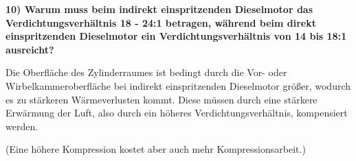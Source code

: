 \textbf{10) Warum muss beim indirekt einspritzenden Dieselmotor das
Verdichtungsverhältnis 18 - 24:1 betragen, während beim direkt
einspritzenden Dieselmotor ein Verdichtungsverhältnis von 14 bis 18:1
ausreicht?}

Die Oberfläche des Zylinderraumes ist bedingt durch die Vor- oder
Wirbelkammeroberfläche bei indirekt einspritzenden Dieselmotor größer,
wodurch es zu stärkeren Wärmeverlusten kommt. Diese müssen durch eine
stärkere Erwärmung der Luft, also durch ein höheres
Verdichtungsverhältnis, kompensiert werden.

(Eine höhere Kompression kostet aber auch mehr Kompressionsarbeit.)
